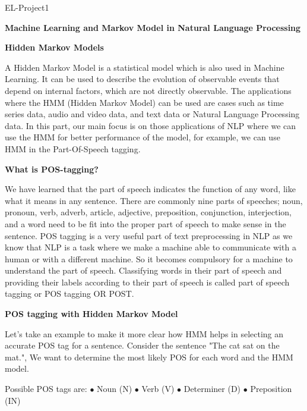 
	EL-Project1
	
	\textbf{Machine Learning and Markov Model in Natural Language Processing}

\vspace{2cm}
    \textbf{Hidden Markov Models}
    
    A Hidden Markov Model is a statistical model which is also used in Machine Learning. It can be used to describe the evolution of observable events that depend on internal factors, which are not directly observable.
    The applications where the HMM (Hidden Markov Model) can be used are cases such as time series data, audio and video data, and text data or Natural Language Processing data. In this part, our main focus is on those applications of NLP where we can use the HMM for better performance of the model, for example, we can use HMM in the Part-Of-Speech tagging.
    
    \vspace{0.5cm}
    \textbf{What is POS-tagging?}
    
    We have learned that the part of speech indicates the function of any word, like what it means in any sentence. There are commonly nine parts of speeches; noun, pronoun, verb, adverb, article, adjective, preposition, conjunction, interjection, and a word need to be fit into the proper part of speech to make sense in the sentence. 
    POS tagging is a very useful part of text preprocessing in NLP as we know that NLP is a task where we make a machine able to communicate with a human or with a different machine. So it becomes compulsory for a machine to understand the part of speech.
    Classifying words in their part of speech and providing their labels according to their part of speech is called part of speech tagging or POS tagging OR POST.
    
    \vspace{0.5cm}
    \textbf{POS tagging with Hidden Markov Model}
    
    Let's take an example to make it more clear how HMM helps in selecting an accurate POS tag for a sentence.
    Consider the sentence "The cat sat on the mat.", We want to determine the most likely POS for each word and the HMM model.
    
    Possible POS tags are: \hspace{1cm} $\bullet$ Noun (N) \hspace{1cm} $\bullet$ Verb (V) \hspace{1cm} $\bullet$ Determiner (D) \hspace{1cm} $\bullet$ Preposition (IN)
    
